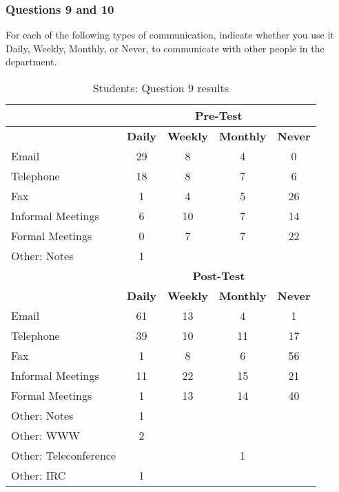 \subsubsection{Questions 9 and 10}

\begin{table}[htbp]
\caption{Students: Question 9 results}
{For each of the following types of communication, indicate whether
  you use it Daily, Weekly, Monthly, or Never, to communicate with other
  people in the department.}
\begin{center}
\begin{tabular}{|l|c|c|c|c|} \hline
 & \multicolumn{4}{|c|}{\bf Pre-Test} \\ \hline 
 & {\bf Daily} & {\bf Weekly} & {\bf Monthly} & {\bf Never} \\ \hline
 {Email}            & 29 &  8 & 4 &  0 \\ \hline 
 {Telephone}        & 18 &  8 & 7 &  6 \\ \hline 
 {Fax}              &  1 &  4 & 5 & 26 \\ \hline 
 {Informal Meetings}&  6 & 10 & 7 & 14 \\ \hline 
 {Formal Meetings}  &  0 &  7 & 7 & 22 \\ \hline 
 {Other: Notes}     &  1 &    &   &    \\ \hline \hline
 & \multicolumn{4}{|c|}{\bf Post-Test} \\ \hline 
 & {\bf Daily} & {\bf Weekly} & {\bf Monthly} & {\bf Never} \\ \hline
 {Email}            & 61 & 13 &  4 &  1 \\ \hline 
 {Telephone}        & 39 & 10 & 11 & 17 \\ \hline 
 {Fax}              &  1 &  8 &  6 & 56 \\ \hline 
 {Informal Meetings}& 11 & 22 & 15 & 21 \\ \hline 
 {Formal Meetings}  &  1 & 13 & 14 & 40 \\ \hline 
 {Other: Notes}     &  1 &    &    &    \\ \hline 
 {Other: WWW}       &  2 &    &    &    \\ \hline 
 {Other: Teleconference} &    &    & 1   &    \\ \hline 
 {Other: IRC}       &  1 &    &    &    \\ \hline 
\end{tabular}
\end{center}
\label{tab:question9s}
\end{table}

